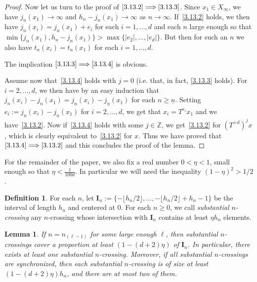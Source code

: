 \documentclass[10pt]{amsart}
\newtheorem{lemm}[theo]{Lemma}\newtheorem{prop}[theo]{Proposition}\newtheorem{coro}[theo]{Corollary}\newtheorem{conj}[theo]{Conjecture}
\theoremstyle{definition}\newtheorem{defi}[theo]{Definition}\newtheorem{rema}[theo]{Remark}\newtheorem{exam}[theo]{Example}\newtheorem{exem}[theo]{Example}\newtheorem{nota}[theo]{Notation}
\newcommand{\egdef}{:=}
\newcommand{\ZZ}{\mathbb{Z}}
\newcommand{\td}{T^{\times d}}
\newcommand{\nb}{\underline{n}}
\newcommand{\ci}{\boldsymbol I}
\begin{document}
\begin{proof}
Now let us turn to the proof of $\eqref{3.13.2}\Longrightarrow\eqref{3.13.3}$. Since $x_1\in X_\infty$, we have $j_n(x_1)\to \infty$ and $h_n-j_n(x_1)\to \infty$ as $n\to\infty$. If~\eqref{3.13.2} holds, we then have $j_n(x_i)=j_n(x_1)+e_i$ for each $i=1,\dots,d$ and each $n$ large enough so that $\min\{j_n(x_1),h_n-j_n(x_1)\}>\max\{|e_2|,\ldots,|e_d|\}$. But then for such an $n$ we also have $t_n(x_i)=t_n(x_1)$ for each $i=1,\ldots,d$.

The implication $\eqref{3.13.3}\Longrightarrow\eqref{3.13.4}$ is obvious.

Assume now that~\eqref{3.13.4} holds with $j=0$ (i.e. that, in fact, \eqref{3.13.3} holds). For $i=2,\ldots,d$, we then have by an easy induction that $j_n(x_i)-j_n(x_1)=j_{\nb}(x_i)-j_{\nb}(x_1)$ for each $n\ge \nb$. Setting $e_i\egdef j_{\nb}(x_i)-j_{\nb}(x_1)$ for $i=2,\ldots,d$, we get that $x_i=T^{e_i}x_1$ and we have~\eqref{3.13.2}. Now if~\eqref{3.13.4} holds with some $j\in\ZZ$, we get~\eqref{3.13.2} for $(\td)^jx$, which is clearly equivalent to~\eqref{3.13.2} for $x$. Thus we have proved that $\eqref{3.13.4}\Longrightarrow\eqref{3.13.2}$ and this concludes the proof of the lemma.
\end{proof}

For the remainder of the paper, we also fix a real number $0<\eta<1$, small enough so that $\eta < \frac{1}{100 d}$. In particular we will need the inequality $(1-\eta)^2>1/2$.

\begin{defi}
For each $n$, let $\ci_n\egdef \{-\lfloor h_n/2\rfloor,\ldots,-\lfloor h_n/2\rfloor+h_n-1\}$ be the interval of length $h_n$ and centered at 0. For each $n\ge0$, we call \emph{substantial $n$-crossing} any $n$-crossing whose intersection with $\ci_n$ contains at least $\eta h_n$ elements.
\end{defi}

\begin{lemm}\label{lemma:substantialncrossings}
If $n=n_{(\ell-1)}$ for some large enough $\ell$, then substantial $n$-crossings cover a proportion at least $(1-(d+2)\eta)$ of $\ci_n$. In particular, there exists at least one substantial $n$-crossing. Moreover, if all substantial $n$-crossings are synchronized, then each substantial $n$-crossing is of size at least $(1-(d+2)\eta) h_n$, and there are at most two of them.
\end{lemm}
\end{document}
